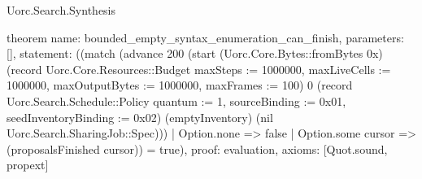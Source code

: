 \begin{lexlean}{Uorc.Search.Synthesis}
\begin{semanticmodule}
theorem{
  name: bounded_empty_syntax_enumeration_can_finish,
  parameters: [],
  statement: ((match (advance 200 (start (Uorc.Core.Bytes::fromBytes 0x) (record Uorc.Core.Resources::Budget {maxSteps := 1000000, maxLiveCells := 1000000, maxOutputBytes := 1000000, maxFrames := 100}) 0 (record Uorc.Search.Schedule::Policy {quantum := 1, sourceBinding := 0x01, seedInventoryBinding := 0x02}) (emptyInventory) (nil Uorc.Search.SharingJob::Spec)))
    | Option.none => false
    | Option.some cursor => (proposalsFinished cursor)) = true),
  proof: evaluation{},
  axioms: [Quot.sound, propext]
}
\end{semanticmodule}
\end{lexlean}
